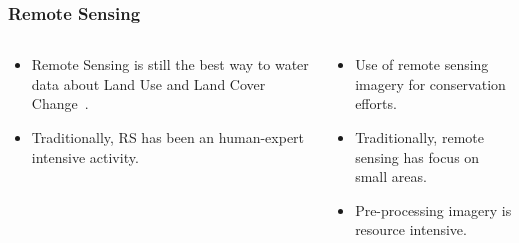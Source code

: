 \documentclass[aspectratio=169]{beamer}
\begin{document}
\begin{frame}
    \frametitle{Remote Sensing}
    \begin{columns}
        \begin{column}{0.5\textwidth}
            \begin{itemize}
                \item Remote Sensing is still the best way to water data about 
                    Land Use and Land Cover Change~\cite{picoli2018}.
                \item Traditionally, RS has been an human-expert intensive 
                    activity.
            \end{itemize}
        \end{column}
        \begin{column}{0.5\textwidth}
            \begin{itemize}
                \item Use of remote sensing imagery for conservation efforts. 
                \item Traditionally, remote sensing has focus on small areas.
                \item Pre-processing imagery is resource intensive.
            \end{itemize}
        \end{column}
    \end{columns}
\end{frame}
\end{document}

